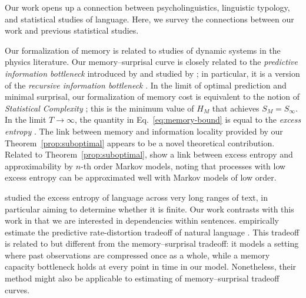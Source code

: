 Our work opens up a connection between psycholinguistics, linguistic typology, and statistical studies of language. Here, we survey the connections between our work and previous statistical studies.



Our formalization of memory is related to studies of dynamic systems in the physics literature.
Our memory--surprisal curve is closely related to the \emph{predictive information bottleneck} introduced by \citet{still-information-2014} and studied by \citet{marzen-predictive-2016}; in particular, it is a version of the \emph{recursive information bottleneck} \citep[][\S 4]{still-information-2014}. 
In the limit of optimal prediction and minimal surprisal, our formalization of memory cost is equivalent to the notion of \emph{Statistical Complexity} \citep{crutchfield-inferring-1989,shalizi2001computational}; this is the minimum value of $H_M$ that achieves $S_M = S_\infty$.
In the limit $T \rightarrow \infty$, the quantity in Eq.~\ref{eq:memory-bound} is equal to the \emph{excess entropy} \citep{crutchfield-inferring-1989}.
The link between memory and information locality provided by our Theorem~\ref{prop:suboptimal} appears to be a novel theoretical contribution.
Related to Theorem~\ref{prop:suboptimal}, \citet{sharan-prediction-2016} show a link between excess entropy and approximability by $n$-th order Markov models, noting that processes with low excess entropy can be approximated well with Markov models of low order.

\cite{debowski-excess-2011} studied the excess entropy of language across very long ranges of text, in particular aiming to determine whether it is finite.
Our work contrasts with this work in that we are interested in dependencies within sentences.
\cite{hahn2019estimating} empirically estimate the predictive rate-distortion tradeoff of natural language \citep{still-information-2014,marzen-predictive-2016}.
This tradeoff is related to but different from the memory--surprisal tradeoff: it models a setting where past observations are compressed once as a whole, while a memory capacity bottleneck holds at every point in time in our model.
Nonetheless, their method might also be applicable to estimating of memory--surprisal tradeoff curves.



